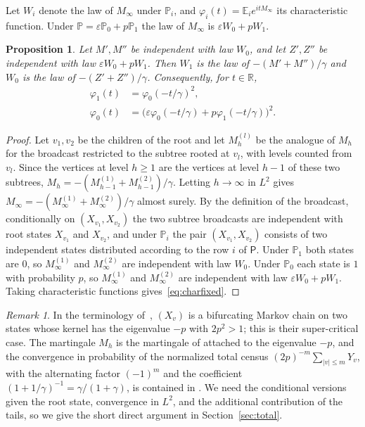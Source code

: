\documentclass{amsart}
\newtheorem{proposition}[theorem]{Proposition}
\theoremstyle{definition}
\theoremstyle{remark}
\newtheorem{remark}[theorem]{Remark}
\numberwithin{equation}{section}
\newcommand{\eps}{\varepsilon}
\newcommand{\E}{\mathbb{E}}
\newcommand{\Prob}{\mathbb{P}}
\newcommand{\R}{\mathbb{R}}
\newcommand{\abs}[1]{\lvert #1\rvert}
\begin{document}
Let $W_i$ denote the law of $M_\infty$ under $\Prob_i$, and $\varphi_i(t)=\E_ie^{itM_\infty}$ its characteristic function. Under $\Prob=\eps\Prob_0+p\Prob_1$ the law of $M_\infty$ is $\eps W_0+pW_1$.

\begin{proposition}\label{prop:fixedpointlaw}
Let $M',M''$ be independent with law $W_0$, and let $Z',Z''$ be independent with law $\eps W_0+pW_1$. Then $W_1$ is the law of $-(M'+M'')/\gamma$ and $W_0$ is the law of $-(Z'+Z'')/\gamma$. Consequently, for $t\in\R$,
\begin{equation}\label{eq:charfixed}
\begin{aligned}
\varphi_1(t)&=\varphi_0(-t/\gamma)^2,\\
\varphi_0(t)&=\bigl(\eps\varphi_0(-t/\gamma)+p\varphi_1(-t/\gamma)\bigr)^2 .
\end{aligned}
\end{equation}
\end{proposition}

\begin{proof}
Let $v_1,v_2$ be the children of the root and let $M^{(l)}_h$ be the analogue of $M_h$ for the broadcast restricted to the subtree rooted at $v_l$, with levels counted from $v_l$. Since the vertices at level $h\ge1$ are the vertices at level $h-1$ of these two subtrees, $M_h=-(M^{(1)}_{h-1}+M^{(2)}_{h-1})/\gamma$. Letting $h\to\infty$ in $L^2$ gives $M_\infty=-(M^{(1)}_\infty+M^{(2)}_\infty)/\gamma$ almost surely. By the definition of the broadcast, conditionally on $(X_{v_1},X_{v_2})$ the two subtree broadcasts are independent with root states $X_{v_1}$ and $X_{v_2}$, and under $\Prob_i$ the pair $(X_{v_1},X_{v_2})$ consists of two independent states distributed according to the row $i$ of $\mathsf P$. Under $\Prob_1$ both states are $0$, so $M^{(1)}_\infty$ and $M^{(2)}_\infty$ are independent with law $W_0$. Under $\Prob_0$ each state is $1$ with probability $p$, so $M^{(1)}_\infty$ and $M^{(2)}_\infty$ are independent with law $\eps W_0+pW_1$. Taking characteristic functions gives~\eqref{eq:charfixed}.
\end{proof}

\begin{remark}\label{rem:bpd}
In the terminology of~\cite{BPD21}, $(X_v)$ is a bifurcating Markov chain on two states whose kernel has the eigenvalue $-p$ with $2p^2>1$; this is their super-critical case. The martingale $M_h$ is the martingale of \cite[Lemma~3.8]{BPD21} attached to the eigenvalue $-p$, and the convergence in probability of the normalized total census $(2p)^{-m}\sum_{\abs v\le m}Y_v$, with the alternating factor $(-1)^m$ and the coefficient $(1+1/\gamma)^{-1}=\gamma/(1+\gamma)$, is contained in \cite[Theorem~3.9 and Corollary~3.11]{BPD21}. We need the conditional versions given the root state, convergence in $L^2$, and the additional contribution of the tails, so we give the short direct argument in Section~\ref{sec:total}.
\end{remark}
\end{document}
